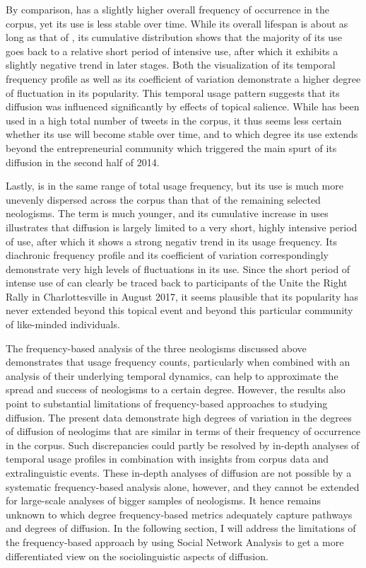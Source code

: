 \documentclass[
  a4paper,
  abstract=on,
  captions=tableabove
  ]{scrartcl}
\begin{document}
        By comparison,  has a slightly higher overall frequency of occurrence in the corpus, yet its use is less stable over time. While its overall lifespan is about as long as that of , its cumulative distribution shows that the majority of its use goes back to a relative short period of intensive use, after which it exhibits a slightly negative trend in later stages. Both the visualization of its temporal frequency profile as well as its coefficient of variation demonstrate a higher degree of fluctuation in its popularity. This temporal usage pattern suggests that its diffusion was influenced significantly by effects of topical salience. While  has been used in a high total number of tweets in the corpus, it thus seems less certain whether its use will become stable over time, and to which degree its use extends beyond the entrepreneurial community which triggered the main spurt of its diffusion in the second half of 2014.

        Lastly,  is in the same range of total usage frequency, but its use is much more unevenly dispersed across the corpus than that of the remaining selected neologisms. The term is much younger, and its cumulative increase in uses illustrates that diffusion is largely limited to a very short, highly intensive period of use, after which it shows a strong negativ trend in its usage frequency. Its diachronic frequency profile and its coefficient of variation correspondingly demonstrate very high levels of fluctuations in its use. Since the short period of intense use of  can clearly be traced back to participants of the Unite the Right Rally in Charlottesville in August 2017, it seems plausible that its popularity has never extended beyond this topical event and beyond this particular community of like-minded individuals.
        
        The frequency-based analysis of the three neologisms discussed above demonstrates that usage frequency counts, particularly when combined with an analysis of their underlying temporal dynamics, can help to approximate the spread and success of neologisms to a certain degree. However, the results also point to substantial limitations of frequency-based approaches to studying diffusion. The present data demonstrate high degrees of variation in the degrees of diffusion of neologims that are similar in terms of their frequency of occurrence in the corpus. Such discrepancies could partly be resolved by in-depth analyses of temporal usage profiles in combination with insights from corpus data and extralinguistic events. These in-depth analyses of diffusion are not possible by a systematic frequency-based analysis alone, however, and they cannot be extended for large-scale analyses of bigger samples of neologisms. It hence remains unknown to which degree frequency-based metrics adequately capture pathways and degrees of diffusion. In the following section, I will address the limitations of the frequency-based approach by using Social Network Analysis to get a more differentiated view on the sociolinguistic aspects of diffusion.
\end{document}
